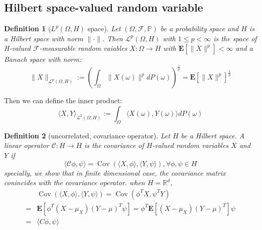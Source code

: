 \documentclass{article}
\newtheorem{definition}{Definition}
\begin{document}
\subsection{Hilbert space-valued random variable}
\begin{definition}[$L^p(\Omega, H)$ space]
    Let $(\Omega, \mathcal{F}, \mathbb{P})$ be a probability space and $H$ is a Hilbert space with norm $\|\cdot\|$. Then $\mathcal{L}^p(\Omega, H)$ with $1\leq p<\infty$ is the space
    of H-valued $\mathcal{F}$-measurable random vaiables $X:\Omega\rightarrow H$ with $\mathbf{E}[\|X\|^p]<\infty$ and a Banach space with norm:
    \begin{equation}
        \|X\|_{\mathcal{L}^p(\Omega, H)}:=\left(\int_\Omega \|X(\omega)\|^pdP(\omega)\right)^{\frac{1}{p}}=\mathbf{E}[\|X\|^p]^{\frac{1}{p}}
    \end{equation}
\end{definition}
Then we can define the inner product: 
\begin{equation}
    \langle X, Y\rangle_{\mathcal{L}^2(\Omega, H)}:=\int_\Omega \langle X(\omega), Y(\omega)\rangle dP(\omega)
\end{equation}
\begin{definition}[uncorrelated, covariance operator]
    Let $H$ be a Hilbert space. A linear operator $\mathcal{C}:H\rightarrow H$ is the covariance of $H$-valued random variables $X$ and $Y$ if 
    \begin{equation}
        \langle\mathcal{C}\phi, \psi\rangle = \operatorname{Cov}\left(\langle X, \phi\rangle, \langle Y, \psi\rangle\right), \forall \phi, \psi \in H
    \end{equation}
    specially, we show that in finite dimensional case, the covariance matrix conincides with the covariance operator. 
    when $H = \mathbb{R}^d$,
    \begin{equation}
        \begin{aligned}
            &\operatorname{Cov}\left(\langle X, \phi\rangle, \langle Y, \psi\rangle\right) 
            = \operatorname{Cov}\left(\phi^T X, \psi^T Y\right)\\
            =&\mathbf{E}\left[\phi^T(X-\mu_X)(Y-\mu)^T\psi\right] 
            = \phi^T\mathbf{E}\left[(X-\mu_X)(Y-\mu)^T\right]\psi\\
            =&\langle C\phi, \psi\rangle
        \end{aligned}
    \end{equation}
\end{definition}
\end{document}
